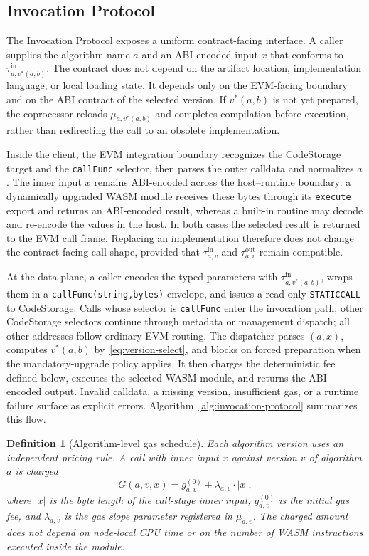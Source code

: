 \documentclass[pdflatex,sn-mathphys-num]{sn-jnl}%
\theoremstyle{thmstyleone}%
\theoremstyle{thmstyletwo}%
\theoremstyle{thmstylethree}%
\newtheorem{definition}{Definition}%
\begin{document}
\subsection{Invocation Protocol}\label{sec3.3}
The Invocation Protocol exposes a uniform contract-facing interface. A caller supplies the algorithm name $a$ and an ABI-encoded input $x$ that conforms to $\tau^{\mathrm{in}}_{a,v^{*}(a,b)}$. The contract does not depend on the artifact location, implementation language, or local loading state. It depends only on the EVM-facing boundary and on the ABI contract of the selected version. If $v^{*}(a,b)$ is not yet prepared, the coprocessor reloads $\mu_{a,v^{*}(a,b)}$ and completes compilation before execution, rather than redirecting the call to an obsolete implementation.

Inside the client, the EVM integration boundary recognizes the CodeStorage target and the \texttt{callFunc} selector, then parses the outer calldata and normalizes $a$. The inner input $x$ remains ABI-encoded across the host--runtime boundary: a dynamically upgraded WASM module receives these bytes through its \texttt{execute} export and returns an ABI-encoded result, whereas a built-in routine may decode and re-encode the values in the host. In both cases the selected result is returned to the EVM call frame. Replacing an implementation therefore does not change the contract-facing call shape, provided that $\tau^{\mathrm{in}}_{a,v}$ and $\tau^{\mathrm{out}}_{a,v}$ remain compatible.

At the data plane, a caller encodes the typed parameters with $\tau^{\mathrm{in}}_{a,v^{*}(a,b)}$, wraps them in a \texttt{callFunc(string,bytes)} envelope, and issues a read-only \texttt{STATICCALL} to CodeStorage. Calls whose selector is \texttt{callFunc} enter the invocation path; other CodeStorage selectors continue through metadata or management dispatch; all other addresses follow ordinary EVM routing. The dispatcher parses $(a,x)$, computes $v^{*}(a,b)$ by~\eqref{eq:version-select}, and blocks on forced preparation when the mandatory-upgrade policy applies. It then charges the deterministic fee defined below, executes the selected WASM module, and returns the ABI-encoded output. Invalid calldata, a missing version, insufficient gas, or a runtime failure surface as explicit errors. Algorithm~\ref{alg:invocation-protocol} summarizes this flow.

\begin{definition}[Algorithm-level gas schedule]
\label{def:gas-schedule}
Each algorithm version uses an independent pricing rule. A call with inner input $x$ against version $v$ of algorithm $a$ is charged
\begin{equation}
G(a,v,x)=g^{(0)}_{a,v}+\lambda_{a,v}\cdot |x|,
\label{eq:gas-price}
\end{equation}
where $|x|$ is the byte length of the call-stage inner input, $g^{(0)}_{a,v}$ is the initial gas fee, and $\lambda_{a,v}$ is the gas slope parameter registered in $\mu_{a,v}$. The charged amount does not depend on node-local CPU time or on the number of WASM instructions executed inside the module.
\end{definition}
\end{document}
